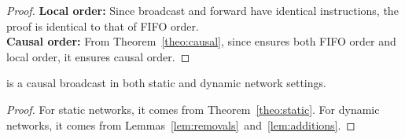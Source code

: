 \begin{proof}
  \textbf{Local order:} Since broadcast and forward have identical instructions,
  the proof is identical to that of FIFO order. \\
  \textbf{Causal order:} From Theorem~\ref{theo:causal}, since \CBROADCAST
  ensures both FIFO order and local order, it ensures causal order.
\end{proof}

\begin{theorem}
  \CBROADCAST is a causal broadcast in both static and dynamic network settings.
\end{theorem}

\begin{proof}
  For static networks, it comes from Theorem~\ref{theo:static}. For dynamic
  networks, it comes from Lemmas~\ref{lem:removals}~and~\ref{lem:additions}.
\end{proof}

